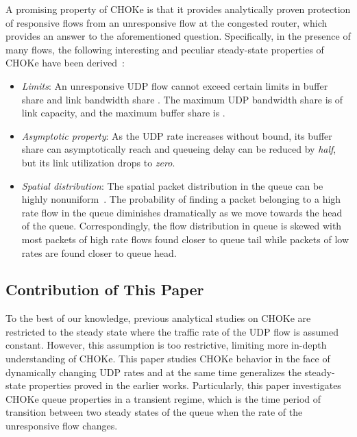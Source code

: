 \documentclass{IEEEtran}
\begin{document}
A promising property of CHOKe is that it provides analytically proven protection of responsive flows from an unresponsive flow at the congested router, which provides an answer to the aforementioned question. Specifically, in the presence of many flows, the following interesting and peculiar steady-state properties of CHOKe have been derived~\cite{ChokeToN04,ChokeSigmetrics03, allertonCHOKe01}:
\begin{itemize}
    \item \emph{Limits}: An unresponsive UDP flow cannot exceed certain limits in buffer share and link bandwidth share \cite{ChokeSigmetrics03, allertonCHOKe01}. The maximum UDP bandwidth share is  of link capacity, and the maximum buffer share is .\item \emph{Asymptotic property}: As the UDP rate increases without bound, its buffer share can asymptotically reach  and queueing delay can be reduced by \emph{half}, but its link utilization drops to \emph{zero}. \item \emph{Spatial distribution}:  The spatial packet distribution in the queue can be highly nonuniform~\cite{ChokeToN04}. The probability of finding  a packet belonging to a high rate flow  in the queue diminishes dramatically as we move towards the head of the queue. Correspondingly, the flow distribution in queue is skewed with most packets of high rate flows found closer to queue tail while packets of low rates are found closer to queue head. \end{itemize}

    \subsection{Contribution of This Paper}

To the best of our knowledge, previous analytical studies on CHOKe \cite{ChokeToN04, ChokeSigmetrics03, allertonCHOKe01} are restricted to the steady state where the traffic rate of the UDP flow is assumed constant.  However, this assumption is too restrictive, limiting more in-depth understanding of CHOKe. This paper studies CHOKe behavior in the face of dynamically changing UDP rates and at the same time generalizes the steady-state properties proved in the earlier works. Particularly, this paper investigates CHOKe queue properties in a transient regime, which is the time period of transition between two steady states of the queue when the rate of the unresponsive flow changes. 
\end{document}
